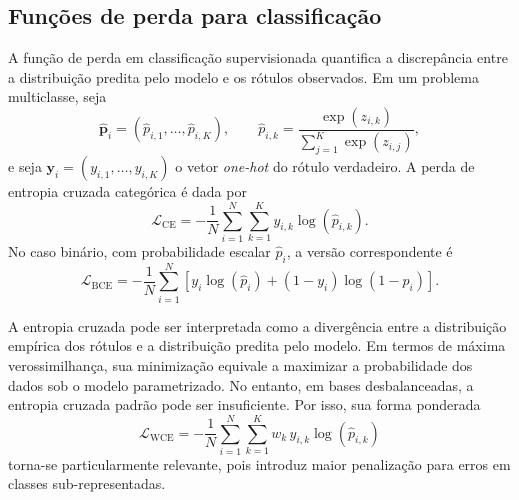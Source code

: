 \documentclass[tcc,capa]{texufpel}
\begin{document}
\subsection{Funções de perda para classificação}

A função de perda em classificação supervisionada quantifica a discrepância entre a distribuição predita pelo modelo e os rótulos observados. Em um problema multiclasse, seja
\begin{equation}
	\hat{\mathbf{p}}_i = (\hat{p}_{i,1},\dots,\hat{p}_{i,K}),
	\qquad
	\hat{p}_{i,k} = \frac{\exp(z_{i,k})}{\sum_{j=1}^{K}\exp(z_{i,j})},
\end{equation}
e seja \(\mathbf{y}_i = (y_{i,1},\dots,y_{i,K})\) o vetor \textit{one-hot} do rótulo verdadeiro. A perda de entropia cruzada categórica é dada por
\begin{equation}
	\mathcal{L}_{\text{CE}}
	=
	-\frac{1}{N}\sum_{i=1}^{N}\sum_{k=1}^{K} y_{i,k}\log(\hat{p}_{i,k}).
\end{equation}
No caso binário, com probabilidade escalar \(\hat{p}_i\), a versão correspondente é
\begin{equation}
	\mathcal{L}_{\text{BCE}}
	=
	-\frac{1}{N}\sum_{i=1}^{N}
	\left[
	y_i \log(\hat{p}_i)
	+
	(1-y_i)\log(1-\hat{p}_i)
	\right].
\end{equation}

A entropia cruzada pode ser interpretada como a divergência entre a distribuição empírica dos rótulos e a distribuição predita pelo modelo. Em termos de máxima verossimilhança, sua minimização equivale a maximizar a probabilidade dos dados sob o modelo parametrizado. No entanto, em bases desbalanceadas, a entropia cruzada padrão pode ser insuficiente. Por isso, sua forma ponderada
\begin{equation}
	\mathcal{L}_{\text{WCE}}
	=
	-\frac{1}{N}\sum_{i=1}^{N}\sum_{k=1}^{K} w_k\, y_{i,k}\log(\hat{p}_{i,k})
\end{equation}
torna-se particularmente relevante, pois introduz maior penalização para erros em classes sub-representadas.
\end{document}
